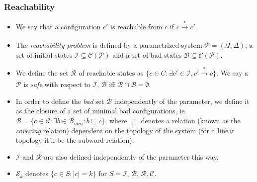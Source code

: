 \documentclass{beamer}
\begin{document}
{        \begin{frame}
            \frametitle{Reachability}
            \begin{itemize}
                \item We say that a configuration $c'$ is reachable from $c$ if $c \xrightarrow[]{*} c'$.
                \item The \textit{reachability problem} is defined by a parametrized system $\mathcal{P} = (\mathcal{Q}, \Delta)$, a set of initial states $\mathcal{I} \subseteq \mathcal{C}(\mathcal{P})$ and a set of bad states $\mathcal{B} \subseteq \mathcal{C}(\mathcal{P})$. 
                \item We define the set $\mathcal{R}$ of reachable states as $\{c \in C: \exists c' \in \mathcal{I}, c' \xrightarrow[]{*} c\}$. We say a $\mathcal{P}$ is \textit{safe} with respect to $\mathcal{I}$, $\mathcal{B}$ iff $\mathcal{R} \cap \mathcal{B} = \emptyset$.
                \item In order to define the \textit{bad} set $\mathcal{B}$ independently of the parameter, we define it as the closure of a set of minimal bad configurations, ie $\mathcal{B} = \{c \in \mathcal{C}: \exists b \in \mathcal{B}_{min}: b \sqsubseteq c\}$, where $\sqsubseteq$ denotes 
                a relation (known as the \textit{covering} relation) dependent on the topology of the system (for a linear topology it'll be the subword relation).
                \item $\mathcal{I}$ and $\mathcal{R}$ are also defined independently of the parameter this way.
                \item $\mathcal{S}_{k}$ denotes $\{c \in S: \left|c\right| = k\}$ for $S = \mathcal{I}$, $\mathcal{B}$, $\mathcal{R}, \mathcal{C}$. 
            \end{itemize}
        \end{frame}
    }
\end{document}
